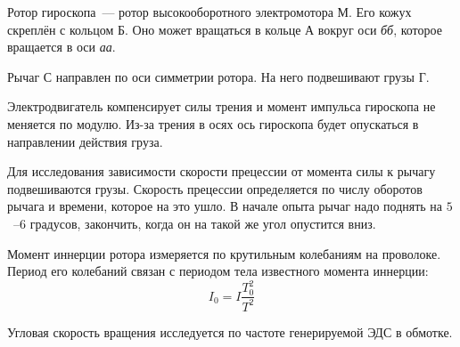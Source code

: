 Ротор гироскопа~--- ротор высокооборотного электромотора М. Его кожух скреплён с кольцом Б.
Оно может вращаться в кольце А вокруг оси {\itshape бб}, которое вращается в оси {\itshape аа}.

Рычаг С направлен по оси симметрии ротора. На него подвешивают грузы Г.

Электродвигатель компенсирует силы трения и момент импульса гироскопа не меняется по модулю.
Из-за трения в осях ось гироскопа будет опускаться в направлении действия груза.

Для исследования зависимости скорости прецессии от момента силы к рычагу подвешиваются
грузы. Скорость прецессии определяется по числу оборотов рычага и времени, которое на это
ушло. В начале опыта рычаг надо поднять на $5$~--$6$ градусов, закончить, когда он на такой
же угол опустится вниз.

Момент иннерции ротора измеряется по крутильным колебаниям на проволоке. Период его
колебаний связан с периодом тела известного момента иннерции:
\[
    I_0=I\frac{T_0^2}{T^2}
\]

Угловая скорость вращения исследуется по частоте генерируемой ЭДС в обмотке.